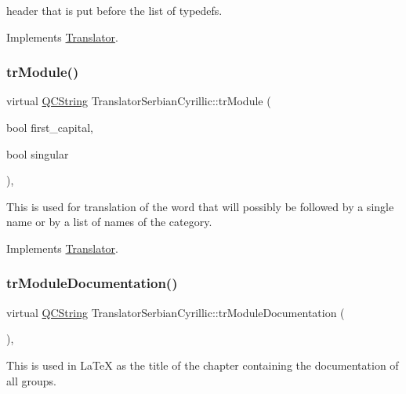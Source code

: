header that is put before the list of typedefs. 

Implements \mbox{\hyperlink{class_translator}{Translator}}.

\mbox{\label{class_translator_serbian_cyrillic_a4bbc03d2bfbed6422b0737833d840d5e}} 
\subsubsection{\texorpdfstring{trModule()}{trModule()}}
{\footnotesize\ttfamily virtual \mbox{\hyperlink{class_q_c_string}{Q\+C\+String}} Translator\+Serbian\+Cyrillic\+::tr\+Module (\begin{DoxyParamCaption}\item[{bool}]{first\+\_\+capital,  }\item[{bool}]{singular }\end{DoxyParamCaption})\hspace{0.3cm}{\ttfamily [inline]}, {\ttfamily [virtual]}}

This is used for translation of the word that will possibly be followed by a single name or by a list of names of the category. 

Implements \mbox{\hyperlink{class_translator}{Translator}}.

\mbox{\label{class_translator_serbian_cyrillic_a32950c13050db230bdb85fc7b42a509d}} 
\subsubsection{\texorpdfstring{trModuleDocumentation()}{trModuleDocumentation()}}
{\footnotesize\ttfamily virtual \mbox{\hyperlink{class_q_c_string}{Q\+C\+String}} Translator\+Serbian\+Cyrillic\+::tr\+Module\+Documentation (\begin{DoxyParamCaption}{ }\end{DoxyParamCaption})\hspace{0.3cm}{\ttfamily [inline]}, {\ttfamily [virtual]}}

This is used in La\+TeX as the title of the chapter containing the documentation of all groups. 

